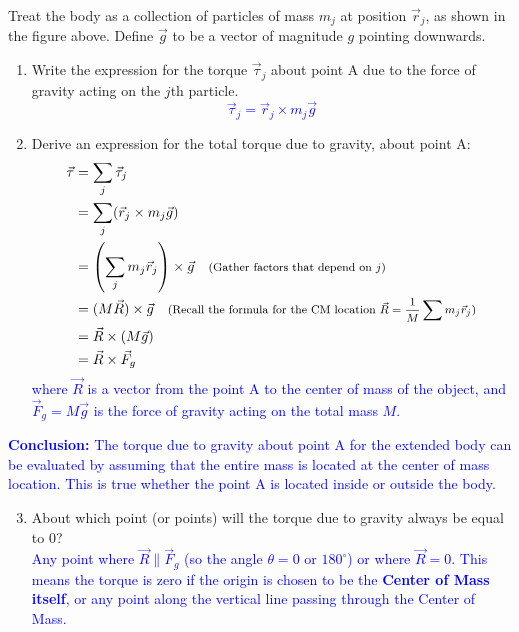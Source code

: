 \documentclass[11pt, letterpaper, openany]{book}
\newenvironment{exercise}[1][Exercise]{%
  \tcolorbox[blanker, breakable, left=1em,
    before skip=1em, after skip=1em,
    borderline west={3pt}{0pt}{PhysNavy},
    colback=PhysCream,
    before upper={\textcolor{PhysNavy}{\sffamily\bfseries #1:}\space}
  ]%
}{%
  \endtcolorbox%
}
\begin{document}
\begin{exercise}[Exercise 1]
Treat the body as a collection of particles of mass $m_j$ at position $\vec{r}_j$, as shown in the figure above. Define $\vec{g}$ to be a vector of magnitude $g$ pointing downwards.
\begin{enumerate}[label=(\alph*)]
    \item Write the expression for the torque $\vec{\tau}_j$ about point A due to the force of gravity acting on the $j$th particle. \\
    \textcolor{blue}{\[ \vec{\tau}_j = \vec{r}_j \times m_j\vec{g} \]}
    
    \item Derive an expression for the total torque due to gravity, about point A: \\
    \textcolor{blue}{
    \begin{align*}
        \vec{\tau} &= \sum_j \vec{\tau}_j \\
        &= \sum_j (\vec{r}_j \times m_j\vec{g}) \\
        &= \left( \sum_j m_j\vec{r}_j \right) \times \vec{g} \quad \text{\footnotesize{(Gather factors that depend on $j$)}} \\
        &= (M\vec{R}) \times \vec{g} \quad \text{\footnotesize{(Recall the formula for the CM location $\vec{R} = \frac{1}{M}\sum m_j\vec{r}_j$)}} \\
        &= \vec{R} \times (M\vec{g}) \\
        &= \vec{R} \times \vec{F}_g
    \end{align*}
    where $\vec{R}$ is a vector from the point A to the center of mass of the object, and $\vec{F}_g = M\vec{g}$ is the force of gravity acting on the total mass $M$.
    }
\end{enumerate}
\end{exercise}

\textcolor{blue}{\textbf{Conclusion:} The torque due to gravity about point A for the extended body can be evaluated by assuming that the entire mass is located at the center of mass location. This is true whether the point A is located inside or outside the body.}

\begin{enumerate}[label=(\c*)]
    \setcounter{enumi}{2}
    \item About which point (or points) will the torque due to gravity always be equal to 0? \\
    \textcolor{blue}{
    Any point where $\vec{R} \parallel \vec{F}_g$ (so the angle $\theta = 0$ or $180^\circ$) or where $\vec{R} = 0$. This means the torque is zero if the origin is chosen to be the \textbf{Center of Mass itself}, or any point along the vertical line passing through the Center of Mass.
    }
\end{enumerate}
\end{document}
